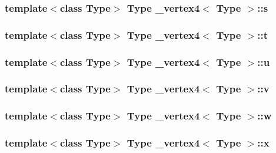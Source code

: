 \hypertarget{class__vertex4_aa7123465b4037edc64a3e5d1ee13bfad}{
\subsubsection[{s}]{\setlength{\rightskip}{0pt plus 5cm}template$<$class Type$>$ Type {\bf \+\_\+vertex4}$<$ Type $>$\+::s}}\label{class__vertex4_aa7123465b4037edc64a3e5d1ee13bfad}
\hypertarget{class__vertex4_a4dd7f37de40f133baaadabda56995781}{
\subsubsection[{t}]{\setlength{\rightskip}{0pt plus 5cm}template$<$class Type$>$ Type {\bf \+\_\+vertex4}$<$ Type $>$\+::t}}\label{class__vertex4_a4dd7f37de40f133baaadabda56995781}
\hypertarget{class__vertex4_a4cbcf7c136545b28651d1dc5fcd0bcbd}{
\subsubsection[{u}]{\setlength{\rightskip}{0pt plus 5cm}template$<$class Type$>$ Type {\bf \+\_\+vertex4}$<$ Type $>$\+::u}}\label{class__vertex4_a4cbcf7c136545b28651d1dc5fcd0bcbd}
\hypertarget{class__vertex4_aa482b2b78ee03de722c171502ddbff4f}{
\subsubsection[{v}]{\setlength{\rightskip}{0pt plus 5cm}template$<$class Type$>$ Type {\bf \+\_\+vertex4}$<$ Type $>$\+::v}}\label{class__vertex4_aa482b2b78ee03de722c171502ddbff4f}
\hypertarget{class__vertex4_aedc561486a2aa5aded4b2b931b3aa905}{
\subsubsection[{w}]{\setlength{\rightskip}{0pt plus 5cm}template$<$class Type$>$ Type {\bf \+\_\+vertex4}$<$ Type $>$\+::w}}\label{class__vertex4_aedc561486a2aa5aded4b2b931b3aa905}
\hypertarget{class__vertex4_a5ccbc85f7d9c91ccbef8b2f43f0f4727}{
\subsubsection[{x}]{\setlength{\rightskip}{0pt plus 5cm}template$<$class Type$>$ Type {\bf \+\_\+vertex4}$<$ Type $>$\+::x}}\label{class__vertex4_a5ccbc85f7d9c91ccbef8b2f43f0f4727}
